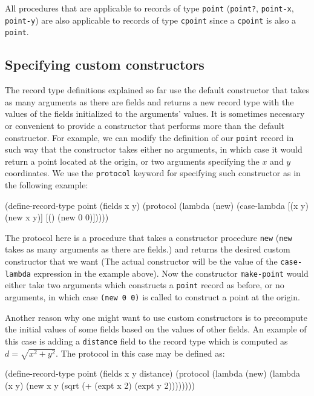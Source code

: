 \documentclass[onecolumn, 12pt, twoside, openright, dvipdfm]{book}
\begin{document}
All procedures that are applicable to records of type
\texttt{point} (\texttt{point?}, \texttt{point-x},
\texttt{point-y}) are also applicable to records of type
\texttt{cpoint} since a \texttt{cpoint} is also a \texttt{point}.

\subsection{Specifying custom constructors}

The record type definitions explained so far use the default
constructor that takes as many arguments as there are fields and
returns a new record type with the values of the fields initialized
to the arguments' values.  It is sometimes necessary or convenient
to provide a constructor that performs more than the default
constructor.  For example, we can modify the definition of our
\texttt{point} record in such way that the constructor takes either
no arguments, in which case it would return a point located at the
origin, or two arguments specifying the $x$ and $y$ coordinates.  We
use the \texttt{protocol} keyword for specifying such constructor as
in the following example:

\begin{CodeInline}
(define-record-type point
  (fields x y)
  (protocol
    (lambda (new)
      (case-lambda
        [(x y) (new x y)]
        [()    (new 0 0)]))))
\end{CodeInline}

The protocol here is a procedure that takes a constructor procedure
\texttt{new} (\texttt{new} takes as many arguments as there are
fields.) and returns the desired custom constructor that we want
(The actual constructor will be the value of the
\texttt{case-lambda} expression in the example above).
Now the constructor \texttt{make-point} would either take two
arguments which constructs a \texttt{point} record as before, or no
arguments, in which case \texttt{(new 0 0)} is called to construct a
point at the origin. 

Another reason why one might want to use custom constructors is to
precompute the initial values of some fields based on the values of
other fields.  An example of this case is adding a \texttt{distance}
field to the record type which is computed as
$d = \sqrt{x^2+y^2}$.  The protocol in this case may be defined as:

\begin{CodeInline}
(define-record-type point
  (fields x y distance)
  (protocol
    (lambda (new)
      (lambda (x y)
        (new x y (sqrt (+ (expt x 2) (expt y 2))))))))
\end{CodeInline}
\end{document}
